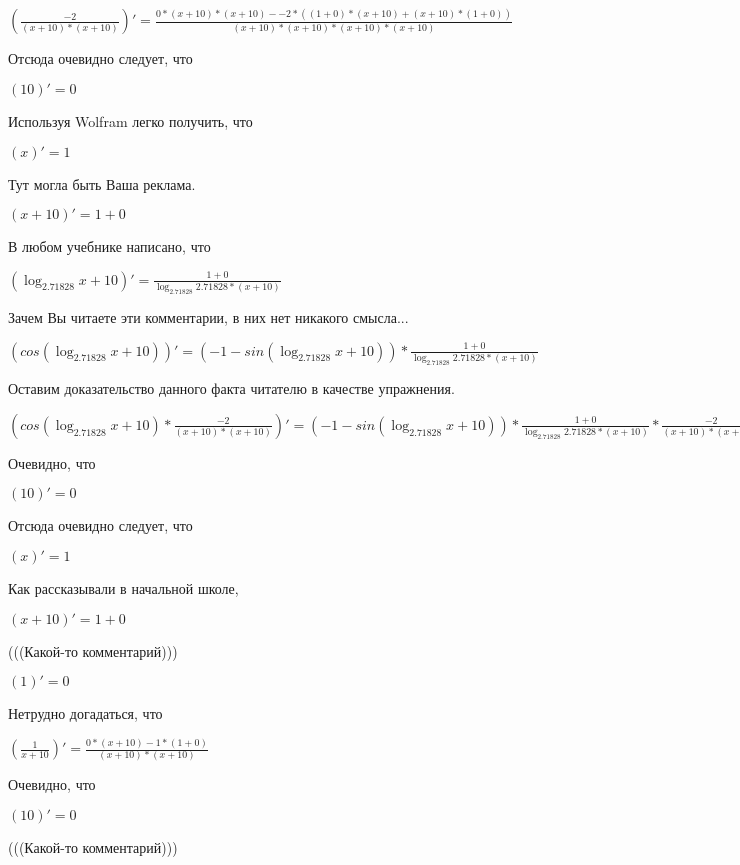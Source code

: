 \documentclass[12pt,a4paper,fleqn]{article}
\theoremstyle{definition}
\begin{document}
$(\frac{ -2 }{( x  +  10 ) * ( x  +  10 )}
)' = \frac{ 0  * ( x  +  10 ) * ( x  +  10 ) -  -2  * (( 1  +  0 ) * ( x  +  10 ) + ( x  +  10 ) * ( 1  +  0 ))}{( x  +  10 ) * ( x  +  10 ) * ( x  +  10 ) * ( x  +  10 )}
$

Отсюда очевидно следует, что

$( 10 )' =  0 $

Используя Wolfram легко получить, что

$( x )' =  1 $

Тут могла быть Ваша реклама.

$( x  +  10 )' =  1  +  0 $

В любом учебнике написано, что

$(\log_{ 2.71828 }{ x  +  10 })' = \frac{ 1  +  0 }{\log_{ 2.71828 }{ 2.71828 } * ( x  +  10 )}
$

Зачем Вы читаете эти комментарии, в них нет никакого смысла...

$(cos(\log_{ 2.71828 }{ x  +  10 }))' = ( -1  - sin(\log_{ 2.71828 }{ x  +  10 })) * \frac{ 1  +  0 }{\log_{ 2.71828 }{ 2.71828 } * ( x  +  10 )}
$

Оставим доказательство данного факта читателю в качестве упражнения.

$(cos(\log_{ 2.71828 }{ x  +  10 }) * \frac{ -2 }{( x  +  10 ) * ( x  +  10 )}
)' = ( -1  - sin(\log_{ 2.71828 }{ x  +  10 })) * \frac{ 1  +  0 }{\log_{ 2.71828 }{ 2.71828 } * ( x  +  10 )}
 * \frac{ -2 }{( x  +  10 ) * ( x  +  10 )}
 + cos(\log_{ 2.71828 }{ x  +  10 }) * \frac{ 0  * ( x  +  10 ) * ( x  +  10 ) -  -2  * (( 1  +  0 ) * ( x  +  10 ) + ( x  +  10 ) * ( 1  +  0 ))}{( x  +  10 ) * ( x  +  10 ) * ( x  +  10 ) * ( x  +  10 )}
$

Очевидно, что

$( 10 )' =  0 $

Отсюда очевидно следует, что

$( x )' =  1 $

Как рассказывали в начальной школе,

$( x  +  10 )' =  1  +  0 $

(((Какой-то комментарий)))

$( 1 )' =  0 $

Нетрудно догадаться, что

$(\frac{ 1 }{ x  +  10 }
)' = \frac{ 0  * ( x  +  10 ) -  1  * ( 1  +  0 )}{( x  +  10 ) * ( x  +  10 )}
$

Очевидно, что

$( 10 )' =  0 $

(((Какой-то комментарий)))
\end{document}
